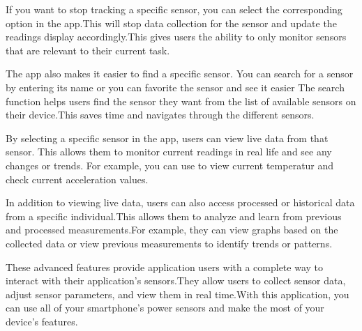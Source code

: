 \documentclass[12pt]{article}
\newcounter{fr}
\begin{document}
\begin{itemize}
\begin{minipage}[t]{0.3\textwidth}
    \end{minipage} 
    \hfill
    \begin{minipage}[t]{0.6\textwidth}
    \item[4]
    If you want to stop tracking a specific sensor, you can select the corresponding option in the app.This will stop data collection for the sensor and update the readings display accordingly.This gives users the ability to only monitor sensors that are relevant to their current task.
    \item[5]
    The app also makes it easier to find a specific sensor. You can search for a sensor by entering its name or you can favorite the sensor and see it easier
    The search function helps users find the sensor they want from the list of available sensors on their device.This saves time and navigates through the different sensors.
    \item[6]
    By selecting a specific sensor in the app, users can view live data from that sensor. This allows them to monitor current readings in real life and see any changes or trends. For example, you can use to view current temperatur and check current acceleration values. 
    \end{minipage}
    \item[7]
    In addition to viewing live data, users can also access processed or historical data from a specific individual.This allows them to analyze and learn from previous and processed measurements.For example, they can view graphs based on the collected data or view previous measurements to identify trends or patterns.
\end{itemize}
    These advanced features provide application users with a complete way to interact with their application's sensors.They allow users to collect sensor data, adjust sensor parameters, and view them in real time.With this application, you can use all of your smartphone's power sensors and make the most of your device's features.
\end{document}
